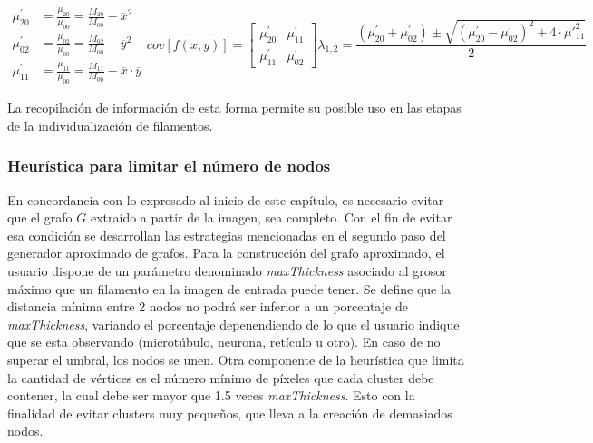 \begin{subequations}
\begin{align}
    \mu_{20}^{\prime} &= \frac{\mu_{20}}{\mu_{00}} = \frac{M_{20}}{M_{00}} - \overline{x}^{2} \label{eq:mu20} \\
    \mu_{02}^{\prime} &= \frac{\mu_{02}}{\mu_{00}} = \frac{M_{02}}{M_{00}} - \overline{y}^{2} \label{eq:mu02} \\
    \mu_{11}^{\prime} &= \frac{\mu_{11}}{\mu_{00}} = \frac{M_{11}}{M_{00}} - \overline{x}\cdot\overline{y} \label{eq:mu11}
\end{align}

\begin{equation}
    \label{eq:covMatLambda}
    cov[f(x,y)] = \begin{bmatrix}
        \mu_{20}^{\prime} & \mu_{11}^{\prime} \\
        \mu_{11}^{\prime} & \mu_{02}^{\prime} 
        \end{bmatrix}
\end{equation}

\begin{equation}
    \label{eq:lambdaMoments}
    \lambda_{1,2} = \dfrac{(\mu_{20}^{\prime} + \mu_{02}^{\prime}) \pm \sqrt{(\mu_{20}^{\prime} - \mu_{02}^{\prime})^{2} + 4\cdot \mu\prime_{11}^{2} }}{2}
\end{equation}
\end{subequations}

La recopilaci\'on de informaci\'on de esta forma permite su posible uso en las etapas de la individualizaci\'on de filamentos.


\subsubsection{Heurística para limitar el n\'umero de nodos}
En concordancia con lo expresado al inicio de este cap\'itulo, es necesario evitar que el grafo $G$ extra\'ido a partir de la imagen, sea completo. Con el fin de evitar esa condici\'on se desarrollan las estrategias mencionadas en el segundo paso del generador aproximado de grafos. Para la construcci\'on del grafo aproximado, el usuario dispone de un par\'ametro denominado {\it maxThickness} asociado al grosor m\'aximo que un filamento en la imagen de entrada puede tener. Se define que la distancia m\'inima entre 2 nodos no podr\'a ser inferior a un porcentaje de {\it maxThickness}, variando el porcentaje depenendiendo de lo que el usuario indique que se esta observando (microt\'ubulo, neurona, ret\'iculo u otro). En caso de no superar el umbral, los nodos se unen. Otra componente de la heur\'istica que limita la cantidad de v\'ertices es el n\'umero m\'inimo de p\'ixeles que cada cluster debe contener, la cual debe ser mayor que 1.5 veces {\it maxThickness}. Esto con la finalidad de evitar clusters muy peque\~nos, que lleva a la creaci\'on de demasiados nodos. 

